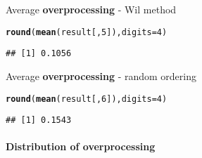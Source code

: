 \documentclass{article}\usepackage[]{graphicx}\usepackage[]{color}
\makeatletter
\newcommand{\hlnum}[1]{\textcolor[rgb]{0.686,0.059,0.569}{#1}}%
\newcommand{\hlstd}[1]{\textcolor[rgb]{0.345,0.345,0.345}{#1}}%
\newcommand{\hlkwc}[1]{\textcolor[rgb]{0.333,0.667,0.333}{#1}}%
\newcommand{\hlkwd}[1]{\textcolor[rgb]{0.737,0.353,0.396}{\textbf{#1}}}%
\newenvironment{kframe}{%
 \def\at@end@of@kframe{}%
 \ifinner\ifhmode%
  \def\at@end@of@kframe{\end{minipage}}%
  \begin{minipage}{\columnwidth}%
 \fi\fi%
 \def\FrameCommand##1{\hskip\@totalleftmargin \hskip-\fboxsep
 \colorbox{shadecolor}{##1}\hskip-\fboxsep
     \hskip-\linewidth \hskip-\@totalleftmargin \hskip\columnwidth}%
 \MakeFramed {\advance\hsize-\width
   \@totalleftmargin\z@ \linewidth\hsize
   \@setminipage}}%
 {\par\unskip\endMakeFramed%
 \at@end@of@kframe}
\newenvironment{knitrout}{}{} %
\makeatother
\begin{document}
Average \textbf{overprocessing} - Wil method

\begin{knitrout}
\color{fgcolor}\begin{kframe}
\begin{alltt}
\hlkwd{round}\hlstd{(}\hlkwd{mean}\hlstd{(result[,}\hlnum{5}\hlstd{]),}\hlkwc{digits} \hlstd{=} \hlnum{4}\hlstd{)}
\end{alltt}
\begin{verbatim}
## [1] 0.1056
\end{verbatim}
\end{kframe}
\end{knitrout}

Average \textbf{overprocessing} - random ordering

\begin{knitrout}
\color{fgcolor}\begin{kframe}
\begin{alltt}
\hlkwd{round}\hlstd{(}\hlkwd{mean}\hlstd{(result[,}\hlnum{6}\hlstd{]),}\hlkwc{digits} \hlstd{=} \hlnum{4}\hlstd{)}
\end{alltt}
\begin{verbatim}
## [1] 0.1543
\end{verbatim}
\end{kframe}
\end{knitrout}

\paragraph{Distribution of overprocessing}
\end{document}
